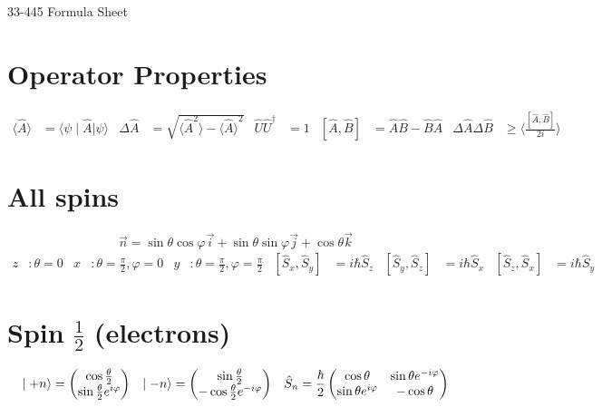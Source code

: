 \documentclass{article}
\newcommand{\bra}[1]{\ensuremath{\langle#1\mid}}
\newcommand{\ket}[1]{\ensuremath{\mid#1\rangle}}
\newcommand{\expect}[1]{\ensuremath{\langle#1\rangle}}
\newcommand{\op}[1]{\ensuremath{\hat#1}}
\newcommand{\opt}[1]{\ensuremath{\hat#1^\dagger}}
\newcommand{\mat}[1]{\ensuremath{\begin{pmatrix}\ensuremath{#1}\end{pmatrix}}}
\begin{document}
	\begin{center}
		{\LARGE{33-445 Formula Sheet}}
	\end{center}
	\section*{Operator Properties}
	\begin{align*}
		\expect{\op{A}}&=\bra{\psi}\op{A}\ket{\psi} &
		\Delta\op{A}&=\sqrt{\expect{\op{A}^2}-\expect{\op{A}}^2} &
		\op{U}\opt{U}&=1 & 
		[\op{A},\op{B}]&=\op{A}\op{B}-\op{B}\op{A} &
		\Delta\op{A}\Delta\op{B}&\ge\expect{\frac{[\op{A},\op{B}]}{2i}}
	\end{align*}
	\section*{All spins}
	\[\vec{n}=\sin\theta\cos\varphi\vec{i}+
			\sin\theta\sin\varphi\vec{j}+\cos\theta\vec{k}\]
	\begin{align*}
		z&:\theta=0 & 
		x&:\theta=\frac{\pi}{2},\varphi=0 &
		y&:\theta=\frac{\pi}{2},\varphi=\frac{\pi}{2} &
		[\op{S_x},\op{S_y}]&=i\hbar\op{S_z} &
		[\op{S_y},\op{S_z}]&=i\hbar\op{S_x} &
		[\op{S_z},\op{S_x}]&=i\hbar\op{S_y}
	\end{align*}
	\section*{Spin $\frac{1}{2}$ (electrons)}
	\begin{align*}
		\ket{+n}&=\mat{\cos\frac{\theta}{2}\\
			\sin\frac{\theta}{2}e^{i\varphi}} &
		\ket{-n}&=\mat{\sin\frac{\theta}{2}\\
			-\cos\frac{\theta}{2}e^{-i\varphi}} &
		\op{S_n}&=\frac{\hbar}{2}\mat{\cos\theta&\sin\theta e^{-i\varphi}\\
			\sin\theta e^{i\varphi}&-\cos\theta} \\
	\end{align*}
\end{document}
